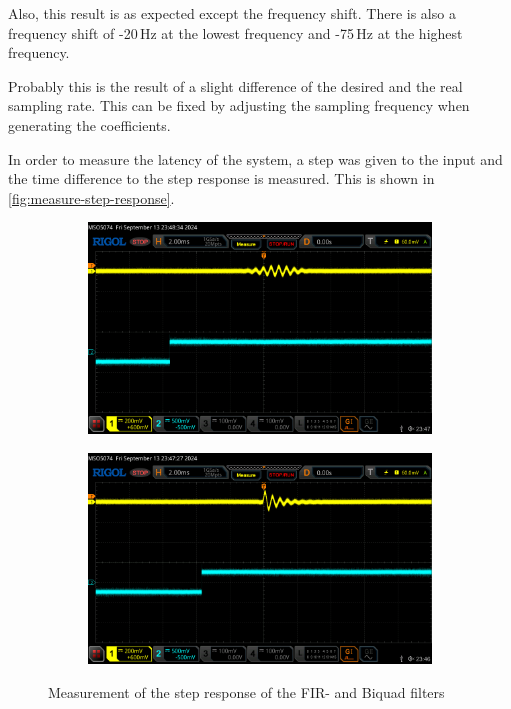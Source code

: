 Also, this result is as expected except the frequency shift. There is also a frequency shift of -20\,Hz at
the lowest frequency and -75\,Hz at the highest frequency.

Probably this is the result of a slight difference of the desired and the real sampling rate. This can be
fixed by adjusting the sampling frequency when generating the coefficients.

In order to measure the latency of the system, a step was given to the input and the time difference to
the step response is measured. This is shown in \autoref{fig:measure-step-response}.

\begin{figure}[!h]
    \centering
    \begin{subfigure}[c]{0.49\textwidth}
        \centering
        \includegraphics[width=\textwidth]{img/step_response_2242_fir_hamming.png}
    \end{subfigure}
    \begin{subfigure}[c]{0.49\textwidth}
        \centering
        \includegraphics[width=\textwidth]{img/step_response_2300_iir.png}
    \end{subfigure}
    \caption{Measurement of the step response of the \ac{FIR}- and Biquad filters}
    \label{fig:measure-step-response}
\end{figure}

